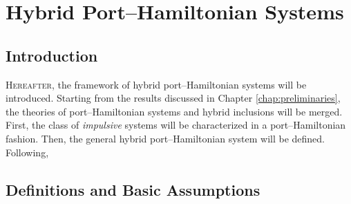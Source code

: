 \chapter{Hybrid Port--Hamiltonian Systems}

\label{chap:HPH_systems}
\minitoc

\thispagestyle{empty}

\newpage
\section{Introduction}
\lettrine[lines=4]{\color{brickred}H}{ereafter}, the framework of hybrid port--Hamiltonian systems will be introduced. Starting from the results discussed in Chapter \ref{chap:preliminaries}, the theories of port--Hamiltonian systems and hybrid inclusions will be merged. First, the class of \textit{impulsive} systems will be characterized in a port--Hamiltonian fashion. Then, the general hybrid port--Hamiltonian system will be defined. Following,
\clearpage

\section{Definitions and Basic Assumptions}

